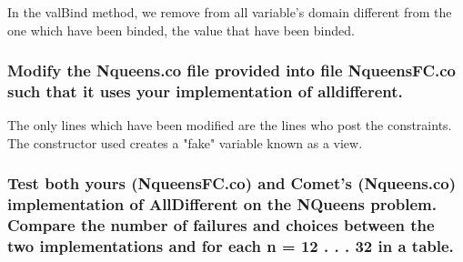 \documentclass[a4paper ,12pt,french]{article}
\begin{document}
In the valBind method, we remove from all variable's domain different from the one which have been binded, the value that have been binded.

\subsubsection{Modify the Nqueens.co file provided into file NqueensFC.co such that it uses your implementation of alldifferent.}
The only lines which have been modified are the lines who post the constraints. The constructor used creates a "fake" variable known as a view.

\subsubsection{Test both yours (NqueensFC.co) and Comet’s (Nqueens.co) implementation of AllDifferent on the NQueens problem. Compare the number of failures and choices between the two implementations and for each n = 12 . . . 32 in a table.}
\end{document}
